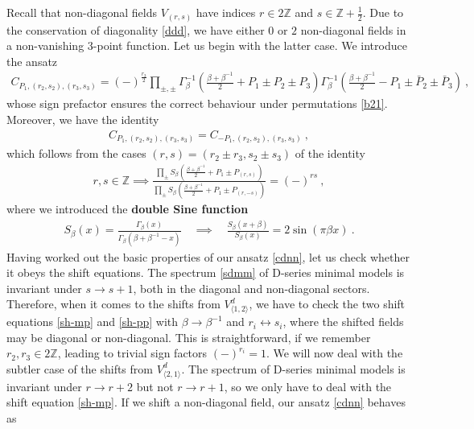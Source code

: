 \documentclass[12pt, a4paper]{article}
\theoremstyle{break}
\begin{document}
Recall that non-diagonal fields $V_{(r,s)}$ have indices $r\in 2\mathbb{Z}$ and $s\in\mathbb{Z}+\frac12$. 
Due to the conservation of diagonality \eqref{ddd}, we have either $0$ or $2$ non-diagonal fields in a non-vanishing 3-point function. Let us begin with the latter case. We introduce the ansatz 
\begin{align}
 \boxed{C_{P_1,(r_2,s_2),(r_3,s_3)} = (-)^{\frac{r_3}{2}}\prod_{\pm,\pm}
 \Gamma_\beta^{-1}\left(\tfrac{\beta+\beta^{-1}}{2}+P_1 \pm P_2\pm P_3\right) 
 \Gamma_\beta^{-1}\left(\tfrac{\beta+\beta^{-1}}{2}-P_1 \pm \bar P_2\pm \bar P_3\right)}\ ,
 \label{cdnn}
\end{align}
whose sign prefactor ensures the correct behaviour under permutations \eqref{b21}. Moreover, we have the identity
\begin{align}
 C_{P_1,(r_2,s_2),(r_3,s_3)}=C_{-P_1,(r_2,s_2),(r_3,s_3)} \ ,
 \label{cpcmp}
\end{align}
which follows from the cases $(r,s)=(r_2\pm r_3,s_2\pm s_3)$ of the identity 
\begin{align}
 r,s\in\mathbb{Z} \implies \frac{\prod_\pm S_\beta\left(\frac{\beta+\beta^{-1}}{2} +P_1 \pm P_{(r,s)}\right)}{\prod_\pm S_\beta\left(\frac{\beta+\beta^{-1}}{2} +P_1 \pm P_{(r,-s)}\right)} =(-)^{rs}\ ,
 \label{dsr}
\end{align}
where we introduced the \textbf{double Sine function}
\begin{align}
 S_\beta(x) = \frac{\Gamma_\beta(x)}{\Gamma_\beta(\beta + \beta^{-1}-x)}\quad \implies \quad \frac{S_\beta(x+\beta)}{S_\beta(x)} = 2\sin(\pi\beta x)\ .
 \label{sb}
\end{align}
Having worked out the basic properties of our ansatz \eqref{cdnn}, let us check whether it obeys the shift equations. The spectrum \eqref{sdmm} of D-series minimal models is invariant under $s\to s+1$, both in the diagonal and non-diagonal sectors. Therefore, when it comes to the shifts from $V^d_{\langle 1,2\rangle}$, we have to check the two shift equations \eqref{sh-mp} and \eqref{sh-pp} with $\beta\to\beta^{-1}$ and $r_i\leftrightarrow s_i$, where the shifted fields may be diagonal or non-diagonal. This is straightforward, if we remember $r_2,r_3\in 2\mathbb{Z}$, leading to trivial sign factors $(-)^{r_i}=1$. We will now deal with the subtler case of the shifts from $V^d_{\langle 2,1\rangle}$. The spectrum of D-series minimal models is invariant under $r\to r+2$ but not $r\to r+1$, so we only have to deal with the shift equation \eqref{sh-mp}. If we shift a non-diagonal field, our ansatz \eqref{cdnn} behaves as 
\end{document}
